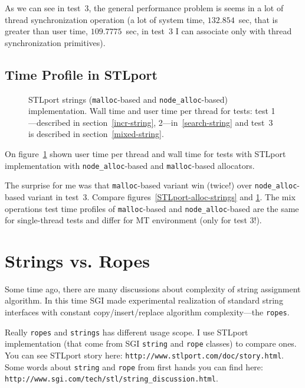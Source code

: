 \documentclass[a4paper]{article}
\providecommand{\STLport}{{\fontfamily{cmss}\selectfont STLport}}
\begin{document}
As we can see in test~3, the general performance problem
is seems in a lot of thread synchronization operation
(a lot of system time, $132.854$~sec, that is greater than
user time, $109.7775$~sec, in test~3 I can associate
only with thread synchronization primitives).

\subsection{Time Profile in \STLport}

\begin{figure}
  \begin{center}
    
  \end{center}
  \caption{STLport
           strings (\texttt{malloc}-based and \texttt{node\_alloc}-based)
           implementation. Wall time and user time per thread for tests:
           test 1---described in section~\ref{incr-string},
           2---in~\ref{search-string} and
           test~3 is described in section~\ref{mixed-string}.
           \label{STLport-MT-strings}}
\end{figure}

On figure~\ref{STLport-MT-strings} shown user time per thread
and wall time for tests with STLport implementation with
\texttt{node\_alloc}-based and \texttt{malloc}-based allocators.

The surprise for me was that \texttt{malloc}-based variant
win (twice!) over \texttt{node\_alloc}-based variant in test~3.
Compare figures~\ref{STLport-alloc-strings} and \ref{STLport-MT-strings}.
The mix operations test time profiles of
\texttt{malloc}-based and \texttt{node\_alloc}-based
are the same for single-thread tests and differ for MT environment
(only for test 3!).


\section{Strings vs. Ropes}

Some time ago, there are many discussions about complexity
of string assignment algorithm.
In this time 
SGI made experimental realization of standard string interfaces
with constant copy/insert/replace algorithm complexity---the \texttt{ropes}.

Really \texttt{ropes} and \texttt{strings} has different usage scope.
I use STLport implementation (that come from SGI \texttt{string} and \texttt{rope}
classes) to compare ones. You can see STLport story here:
\texttt{http://www.stlport.com/doc/story.html}.
Some words about \texttt{string} and \texttt{rope}
from first hands you can find here:\\
\texttt{http://www.sgi.com/tech/stl/string\_discussion.html}.
\end{document}

